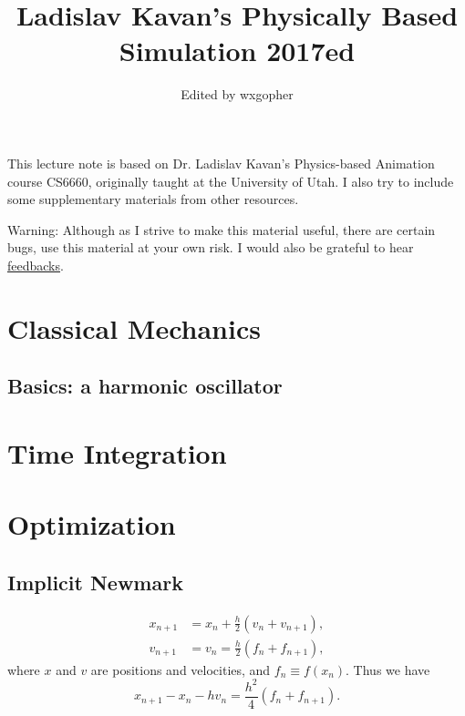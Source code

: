 \documentclass{fancydoc}
\begin{document}
\title{Ladislav Kavan's Physically Based Simulation 2017ed}
\author{Edited by wxgopher}

\maketitle
\tableofcontents
\newpage
{\large This lecture note is based on Dr. Ladislav Kavan's Physics-based Animation course CS6660, originally taught at the University of Utah. I also try to include some supplementary materials from other resources.}


{\large Warning: Although as I strive to make this material useful, there are certain bugs, use this material at your own risk. I would also be grateful to hear \href{mailto:wxguojlu@gmail.com}{feedbacks}.}

\dotfill

\section{Classical Mechanics}

\subsection{Basics: a harmonic oscillator}

\section{Time Integration}

\section{Optimization}
\subsection{Implicit Newmark}

\begin{subequations}
	\begin{align}
	x_{n+1} &= x_n + \frac{h}{2}(v_n + v_{n+1}),\\
	v_{n+1} &= v_n = \frac{h}{2}(f_n + f_{n+1}),
	\end{align}
\end{subequations}
where $x$ and $v$ are positions and velocities, and $f_n \equiv f(x_n)$. Thus we have
\begin{equation}\label{secoptim:nw_eq}
x_{n+1} - x_n - hv_n = \frac{h^2}{4}(f_n + f_{n+1}).
\end{equation}
\end{document}
